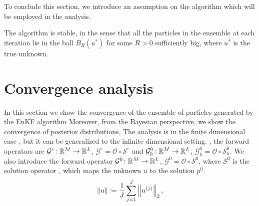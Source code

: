 \documentclass[10pt]{article}
\begin{document}
To conclude this section, we introduce an assumption on the algorithm which will be employed in the analysis.
\begin{assumption} \label{ass_algo} The algorithm is stable, in the sense that all the particles in the ensemble at each iteration lie in the ball $B_R(u^*)$ for some $R > 0$ sufficiently big, where $u^*$ is the true  unknown.
\end{assumption}

\section{Convergence analysis}\label{Convergence}

In this section we show the convergence of the ensemble of particles generated by the EnKF algorithm  Moreover, from the Bayesian perspective, we show the convergence of  posterior distributions,  The analysis is  in the finite dimensional case , but it can be generalized to the infinite dimensional setting. , the forward operators  are $\mathcal{G}^{\varepsilon} \colon \mathbb{R}^M \to \mathbb{R}^L$, $\mathcal{G}^{\varepsilon} = \mathcal{O} \circ \mathcal{S}^{\varepsilon}$ and $\mathcal{G}^0_h \colon \mathbb{R}^M \to \mathbb{R}^L$, $\mathcal{G}^0_h = \mathcal{O} \circ \mathcal{S}^0_h$. We also introduce the forward operator $\mathcal{G}^0 \colon \mathbb{R}^M \to \mathbb{R}^L$, $\mathcal{G}^0 = \mathcal{O} \circ \mathcal{S}^0$, where $\mathcal{S}^0$ is the solution operator , which maps the unknown $u$ to the  solution $p^0$. 
\begin{equation} \label{ensemble_norm}
	\left\|u\right\| \coloneqq \frac{1}{J} \sum_{j=1}^J \left\|u^{(j)}\right\|_2,
\end{equation}
\end{document}
